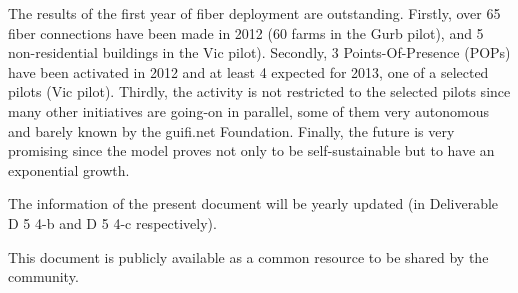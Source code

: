 The results of the first year of fiber deployment are outstanding. Firstly, over 65 fiber connections have been made in 2012 (60 farms in the Gurb pilot), and 5 non-residential buildings in the Vic pilot). Secondly, 3 Points-Of-Presence (POPs) have been activated in 2012 and at least 4 expected for 2013, one of a selected pilots (Vic pilot). Thirdly, the activity is not restricted to the selected pilots since many other initiatives are going-on in parallel, some of them very autonomous and barely known by the guifi.net Foundation. Finally, the future is very promising since the model proves not only to be self-sustainable but to have an exponential growth.

The information of the present document will be yearly updated (in Deliverable D 5 4-b and D 5 4-c respectively).

This document is publicly available as a common resource to be shared by the community.
